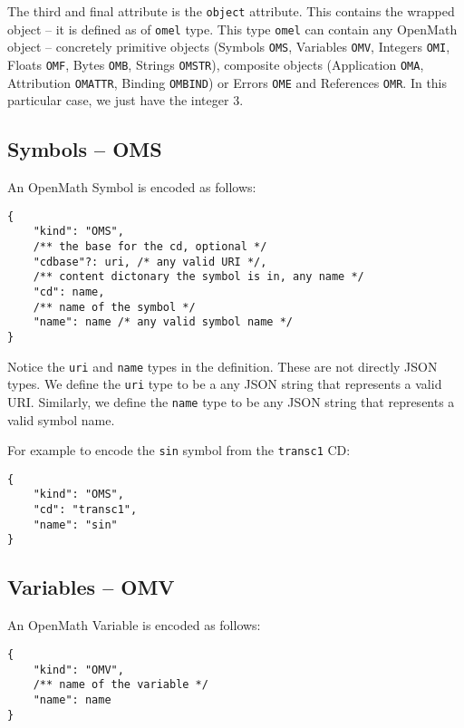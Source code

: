 The third and final attribute is the \texttt{object} attribute. 
This contains the wrapped object -- it is defined as of \texttt{omel} type. 
This type \texttt{omel} can contain any OpenMath object -- concretely primitive objects (Symbols \texttt{OMS}, Variables \texttt{OMV}, Integers \texttt{OMI}, Floats \texttt{OMF}, Bytes \texttt{OMB}, Strings \texttt{OMSTR}), composite objects (Application \texttt{OMA}, Attribution \texttt{OMATTR}, Binding \texttt{OMBIND}) or Errors \texttt{OME} and References \texttt{OMR}. 
In this particular case, we just have the integer $3$. 

\subsection{Symbols -- OMS}

An OpenMath Symbol is encoded as follows:
\\\begin{minipage}{\linewidth}
\begin{lstlisting}
{
    "kind": "OMS",
    /** the base for the cd, optional */
    "cdbase"?: uri, /* any valid URI */, 
    /** content dictonary the symbol is in, any name */
    "cd": name,
    /** name of the symbol */
    "name": name /* any valid symbol name */
}
\end{lstlisting}\end{minipage}

Notice the \texttt{uri} and \texttt{name} types in the definition. 
These are not directly JSON types. 
We define the \texttt{uri} type to be a any JSON string that represents a valid URI. 
Similarly, we define the \texttt{name} type to be any JSON string that represents a valid symbol name. 

For example to encode the \texttt{sin} symbol from the \texttt{transc1} CD:
\\\begin{minipage}{\linewidth}
\begin{lstlisting}
{
    "kind": "OMS",
    "cd": "transc1",
    "name": "sin"
}
\end{lstlisting}\end{minipage}

\subsection{Variables -- OMV}

An OpenMath Variable is encoded as follows:
\\\begin{minipage}{\linewidth}
\begin{lstlisting}
{
    "kind": "OMV",
    /** name of the variable */
    "name": name
}
\end{lstlisting}\end{minipage}

